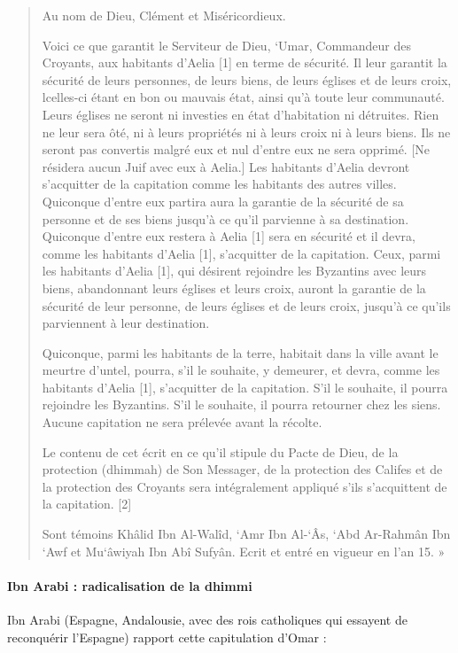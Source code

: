  \begin{quote}
     Au nom de Dieu, Clément et Miséricordieux.

Voici ce que garantit le Serviteur de Dieu, `Umar, Commandeur des Croyants, aux habitants d’Aelia [1] en terme de sécurité. Il leur garantit la sécurité de leurs personnes, de leurs biens, de leurs églises et de leurs croix, lcelles-ci étant en bon ou mauvais état, ainsi qu’à toute leur communauté. Leurs églises ne seront ni investies en état d'habitation ni détruites. Rien ne leur sera ôté, ni à leurs propriétés ni à leurs croix ni à leurs biens. Ils ne seront pas convertis malgré eux et nul d’entre eux ne sera opprimé. [Ne résidera aucun Juif avec eux à Aelia.] Les habitants d’Aelia devront s’acquitter de la capitation comme les habitants des autres villes. Quiconque d’entre eux partira aura la garantie de la sécurité de sa personne et de ses biens jusqu’à ce qu’il parvienne à sa destination. Quiconque d’entre eux restera à Aelia [1] sera en sécurité et il devra, comme les habitants d’Aelia [1], s’acquitter de la capitation. Ceux, parmi les habitants d’Aelia [1], qui désirent rejoindre les Byzantins avec leurs biens, abandonnant leurs églises et leurs croix, auront la garantie de la sécurité de leur personne, de leurs églises et de leurs croix, jusqu’à ce qu’ils parviennent à leur destination.

Quiconque, parmi les habitants de la terre, habitait dans la ville avant le meurtre d’untel, pourra, s’il le souhaite, y demeurer, et devra, comme les habitants d’Aelia [1], s’acquitter de la capitation. S’il le souhaite, il pourra rejoindre les Byzantins. S’il le souhaite, il pourra retourner chez les siens. Aucune capitation ne sera prélevée avant la récolte.

Le contenu de cet écrit en ce qu’il stipule du Pacte de Dieu, de la protection (dhimmah) de Son Messager, de la protection des Califes et de la protection des Croyants sera intégralement appliqué s’ils s’acquittent de la capitation. [2]

Sont témoins Khâlid Ibn Al-Walîd, `Amr Ibn Al-`Âs, `Abd Ar-Rahmân Ibn `Awf et Mu`âwiyah Ibn Abî Sufyân. Ecrit et entré en vigueur en l’an 15. »
 \end{quote}


 \paragraph{Ibn Arabi : radicalisation de la dhimmi} Ibn Arabi (Espagne, Andalousie, avec des rois catholiques qui essayent de reconquérir l'Espagne) rapport cette capitulation d'Omar : 

